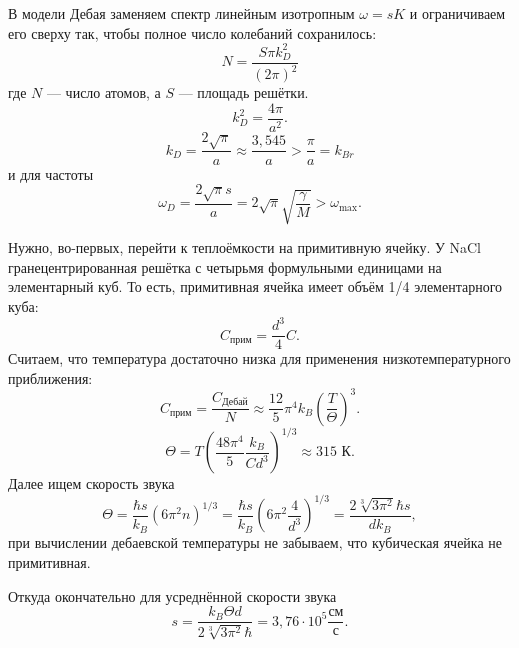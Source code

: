 \documentclass[a4paper]{article}
\begin{document}
В модели Дебая заменяем спектр линейным изотропным
$\omega =sK$ и ограничиваем его сверху так, чтобы
полное число колебаний сохранилось:
\[
	N= \frac{S \pi k_D^2}{\left( 2\pi \right) ^2}
\]
где $N$ --- число атомов, а $S$ --- площадь решётки.
\[
k_D^2= \frac{4\pi}{a^2}
.\] 
\[
k_D= \frac{2\sqrt{\pi} }{a} \approx \frac{3,545}{a}
> \frac{\pi}{a} = k_{Br}
\] 
и для частоты
\[
\omega_D = \frac{2 \sqrt{\pi}s}{a}=
2 \sqrt{\pi}  \sqrt{\frac{\gamma}{M}} > \omega_{\max}
.\] 
\begin{hiProb}[Т2-1]
\end{hiProb}
\begin{sol}
Нужно, во-первых, перейти к теплоёмкости на примитивную
ячейку. У NaCl гранецентрированная решётка с четырьмя
формульными единицами на элементарный куб.
То есть, примитивная ячейка имеет объём 1/4 элементарного куба:
 \[
C _{\text{прим}}= \frac{d^3}{4}C
.\] 
Считаем, что температура достаточно низка для применения низкотемпературного приближения:
\[
C_\text{прим} = \frac{C_{\text{Дебай}}}{N}\approx
\frac{12}{5} \pi^4 k_B \left( \frac{T}{\Theta} \right) ^3
.\] 
\[
	\Theta= T \left( \frac{48 \pi^4}{5}
	\frac{k_B}{C d^3}\right) ^{1 /3} \approx
	315 \text{ К}
.\] 
Далее ищем скорость звука \[\Theta = \frac{\hbar s}{k_B}\left( 6 \pi^2 n \right) ^{1 /3}= \frac{\hbar s}{
k_B} \left( 6 \pi^2 \frac{4}{d^3} \right) ^{1 /3}=
\frac{2 \sqrt[3]{3\pi^2}\hbar s }{d k_B},\]
при вычислении дебаевской температуры не забываем, что
кубическая ячейка не примитивная.

Откуда окончательно для усреднённой скорости звука
\[
	s= \frac{k_B \Theta d}{2 \sqrt[3]{3\pi^2} \hbar }=3,76 \cdot 10^5 \frac{\text{см}}{\text{с}}
.\] 
\end{sol}
\begin{hiProb}[2.47]
\end{hiProb}
\end{document}
